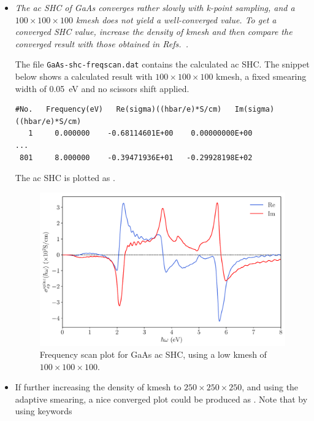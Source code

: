 \begin{itemize}
	\item {\it The ac SHC of GaAs converges rather slowly with k-point sampling, and a $100 \times 100 \times 100$ kmesh does not yield a well-converged value.
	To get a converged SHC value, increase the density of kmesh and then compare the converged result with those obtained in Refs.~.}

	The file {\tt GaAs-shc-freqscan.dat} contains the calculated ac SHC. 
	The snippet below shows a calculated result with 
	$100\times100\times100$ kmesh, 
	a fixed smearing width of 0.05~eV and no scissors shift applied.

\begin{tcolorbox}[title=$100\times100\times100$ kmesh,sharp corners,boxrule=0.5pt]
{\small
\begin{verbatim}
#No.   Frequency(eV)   Re(sigma)((hbar/e)*S/cm)   Im(sigma)((hbar/e)*S/cm)
   1     0.000000    -0.68114601E+00    0.00000000E+00
...
 801     8.000000    -0.39471936E+01   -0.29928198E+02
\end{verbatim}
}
\end{tcolorbox}

The ac SHC is plotted as .
\begin{figure}[htb!]
\centering
\includegraphics[width=.8\columnwidth]{figure/example30/gaas_freqscan_100kpt.pdf}
\caption{Frequency scan plot for GaAs ac SHC, using 
	a low kmesh of $100\times100\times100$.}
\label{fig30.1}
\end{figure}

\item If further increasing the density of kmesh to 
$250\times250\times250$, and using the adaptive smearing, 
a nice converged plot could be produced as . 
Note that by using keywords 
\end{itemize}
